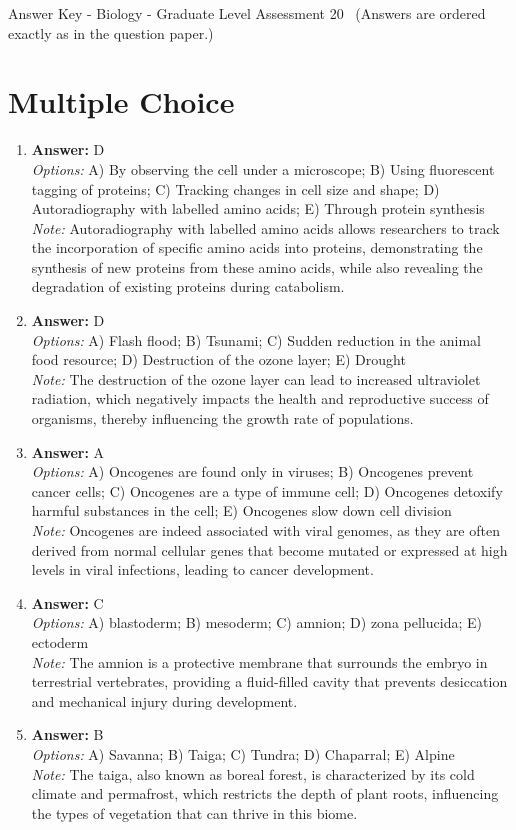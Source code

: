 \documentclass[12pt]{article}
\begin{document}
\begin{center}
Answer Key - Biology - Graduate Level Assessment 20 \
\small (Answers are ordered exactly as in the question paper.)
\end{center}

\section*{Multiple Choice}
\begin{enumerate}[label=\arabic*.]
\item \textbf{Answer:} D
\\ \textit{Options:} A) By observing the cell under a microscope; B) Using fluorescent tagging of proteins; C) Tracking changes in cell size and shape; D) Autoradiography with labelled amino acids; E) Through protein synthesis
\\ \textit{Note:} Autoradiography with labelled amino acids allows researchers to track the incorporation of specific amino acids into proteins, demonstrating the synthesis of new proteins from these amino acids, while also revealing the degradation of existing proteins during catabolism.
\item \textbf{Answer:} D
\\ \textit{Options:} A) Flash flood; B) Tsunami; C) Sudden reduction in the animal food resource; D) Destruction of the ozone layer; E) Drought
\\ \textit{Note:} The destruction of the ozone layer can lead to increased ultraviolet radiation, which negatively impacts the health and reproductive success of organisms, thereby influencing the growth rate of populations.
\item \textbf{Answer:} A
\\ \textit{Options:} A) Oncogenes are found only in viruses; B) Oncogenes prevent cancer cells; C) Oncogenes are a type of immune cell; D) Oncogenes detoxify harmful substances in the cell; E) Oncogenes slow down cell division
\\ \textit{Note:} Oncogenes are indeed associated with viral genomes, as they are often derived from normal cellular genes that become mutated or expressed at high levels in viral infections, leading to cancer development.
\item \textbf{Answer:} C
\\ \textit{Options:} A) blastoderm; B) mesoderm; C) amnion; D) zona pellucida; E) ectoderm
\\ \textit{Note:} The amnion is a protective membrane that surrounds the embryo in terrestrial vertebrates, providing a fluid-filled cavity that prevents desiccation and mechanical injury during development.
\item \textbf{Answer:} B
\\ \textit{Options:} A) Savanna; B) Taiga; C) Tundra; D) Chaparral; E) Alpine
\\ \textit{Note:} The taiga, also known as boreal forest, is characterized by its cold climate and permafrost, which restricts the depth of plant roots, influencing the types of vegetation that can thrive in this biome.
\end{enumerate}
\end{document}
